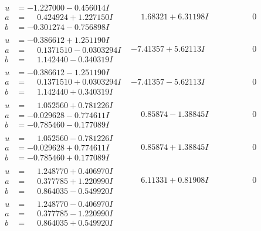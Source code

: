 \documentclass[1p]{elsarticle_modified}
\theoremstyle{definition}
\begin{document}
$$\begin{array}{c|c|c}
\begin{aligned}
u &= -1.227000 - 0.456014 I \\
a &= \phantom{-}0.424924 + 1.227150 I \\
b &= -0.301274 - 0.756898 I\end{aligned}
 & \phantom{-}1.68321 + 6.31198 I & \phantom{-0.000000 } 0 \\ \hline\begin{aligned}
u &= -0.386612 + 1.251190 I \\
a &= \phantom{-}0.1371510 - 0.0303294 I \\
b &= \phantom{-}1.142440 - 0.340319 I\end{aligned}
 & -7.41357 + 5.62113 I & \phantom{-0.000000 } 0 \\ \hline\begin{aligned}
u &= -0.386612 - 1.251190 I \\
a &= \phantom{-}0.1371510 + 0.0303294 I \\
b &= \phantom{-}1.142440 + 0.340319 I\end{aligned}
 & -7.41357 - 5.62113 I & \phantom{-0.000000 } 0 \\ \hline\begin{aligned}
u &= \phantom{-}1.052560 + 0.781226 I \\
a &= -0.029628 - 0.774611 I \\
b &= -0.785460 - 0.177089 I\end{aligned}
 & \phantom{-}0.85874 - 1.38845 I & \phantom{-0.000000 } 0 \\ \hline\begin{aligned}
u &= \phantom{-}1.052560 - 0.781226 I \\
a &= -0.029628 + 0.774611 I \\
b &= -0.785460 + 0.177089 I\end{aligned}
 & \phantom{-}0.85874 + 1.38845 I & \phantom{-0.000000 } 0 \\ \hline\begin{aligned}
u &= \phantom{-}1.248770 + 0.406970 I \\
a &= \phantom{-}0.377785 + 1.220990 I \\
b &= \phantom{-}0.864035 - 0.549920 I\end{aligned}
 & \phantom{-}6.11331 + 0.81908 I & \phantom{-0.000000 } 0 \\ \hline\begin{aligned}
u &= \phantom{-}1.248770 - 0.406970 I \\
a &= \phantom{-}0.377785 - 1.220990 I \\
b &= \phantom{-}0.864035 + 0.549920 I\end{aligned}

\end{array}$$
\end{document}
